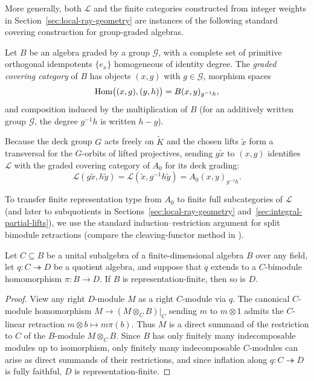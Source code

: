 More generally, both $\mathcal L$ and the finite categories constructed from
integer weights in Section~\ref{sec:local-ray-geometry} are instances of the
following standard covering construction for group-graded algebras.

\begin{definition}
\label{def:graded-covering-category}
Let $B$ be an algebra graded by a group $\mathcal G$, with a complete set of
primitive orthogonal idempotents $\{e_x\}$ homogeneous of identity degree.
The \emph{graded covering category} of $B$ has objects $(x,g)$ with
$g\in\mathcal G$, morphism spaces
\[
 \operatorname{Hom}\bigl((x,g),(y,h)\bigr)=B(x,y)_{g^{-1}h},
\]
and composition induced by the multiplication of $B$ (for an additively
written group $\mathcal G$, the degree $g^{-1}h$ is written $h-g$).
\end{definition}

Because the deck group $G$ acts freely on $\widetilde K$ and the chosen
lifts $\widetilde x$ form a transversal for the $G$-orbits of lifted
projectives, sending $g\widetilde x$ to $(x,g)$ identifies $\mathcal L$ with
the graded covering category of $A_0$ for its deck grading:
\[
 \mathcal L(g\widetilde x,h\widetilde y)
 =\mathcal L(\widetilde x,g^{-1}h\widetilde y)
 =A_0(x,y)_{g^{-1}h}.
\]

To transfer finite representation type from $A_0$ to finite full
subcategories of $\mathcal L$ (and later to subquotients in
Sections~\ref{sec:local-ray-geometry} and~\ref{sec:integral-partial-lifts}),
we use the standard induction--restriction argument for split bimodule
retractions (compare the cleaving-functor method in
\cite[Sections~3.2 and~3.8]{BGRS}).

\begin{lemma}
\label{lem:split-representation-transfer}
Let $C\subseteq B$ be a unital subalgebra of a finite-dimensional algebra $B$
over any field, let $q:C\twoheadrightarrow D$ be a quotient algebra, and
suppose that $q$ extends to a $C$-bimodule homomorphism $\pi:B\to D$. If $B$
is representation-finite, then so is $D$.
\end{lemma}
\begin{proof}
View any right $D$-module $M$ as a right $C$-module via $q$. The canonical
$C$-module homomorphism $M\to(M\otimes_C B)|_C$ sending $m$ to $m\otimes 1$
admits the $C$-linear retraction $m\otimes b\mapsto m\pi(b)$. Thus $M$ is a
direct summand of the restriction to $C$ of the $B$-module $M\otimes_C B$.
Since $B$ has only finitely many indecomposable modules up to isomorphism,
only finitely many indecomposable $C$-modules can arise as direct summands of
their restrictions, and since inflation along $q:C\twoheadrightarrow D$ is
fully faithful, $D$ is representation-finite.
\end{proof}

